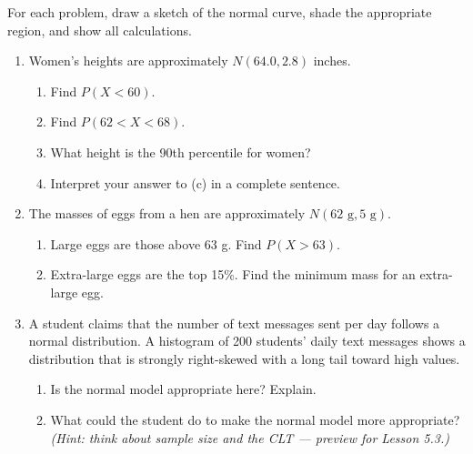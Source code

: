 \documentclass[10pt]{article}
\begin{document}
\namedateperiod

\vspace{0.15in}

For each problem, draw a sketch of the normal curve, shade the appropriate region, and
show all calculations.

\begin{enumerate}

  \item Women's heights are approximately $N(64.0, 2.8)$ inches.
        \begin{enumerate}[label=\alph*.]
          \item Find $P(X < 60)$.
                \vspace{1.0in}
          \item Find $P(62 < X < 68)$.
                \vspace{1.0in}
          \item What height is the 90th percentile for women?
                \vspace{0.9in}
          \item Interpret your answer to (c) in a complete sentence.
        \end{enumerate}

  \item The masses of eggs from a hen are approximately $N(62\text{ g}, 5\text{ g})$.
        \begin{enumerate}[label=\alph*.]
          \item Large eggs are those above 63 g. Find $P(X > 63)$.
                \vspace{1.0in}
          \item Extra-large eggs are the top 15\%. Find the minimum mass for an
                extra-large egg.
                \vspace{0.9in}
        \end{enumerate}

  \item A student claims that the number of text messages sent per day follows a normal
        distribution. A histogram of 200 students' daily text messages shows a
        distribution that is strongly right-skewed with a long tail toward high values.
        \begin{enumerate}[label=\alph*.]
          \item Is the normal model appropriate here? Explain.
          \item What could the student do to make the normal model more appropriate?
                \textit{(Hint: think about sample size and the CLT --- preview for
                Lesson 5.3.)}
        \end{enumerate}

\end{enumerate}
\end{document}
